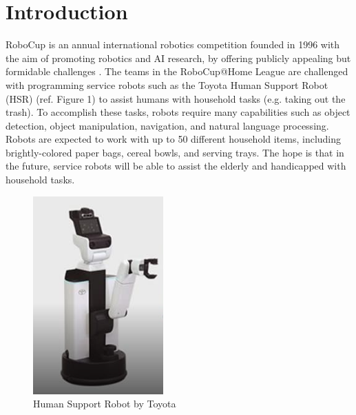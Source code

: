 \documentclass{article}
\begin{document}
\section{Introduction}\label{intro}
RoboCup is an annual international robotics competition founded in 1996 with
the aim of promoting robotics and AI research, by offering publicly 
appealing but formidable challenges \cite{RobocupInitiative1996}.
The teams in the RoboCup@Home League are challenged with programming
service robots such as the Toyota Human Support Robot (HSR) \cite{HSR2018} 
(ref. Figure 1) to assist humans with household tasks (e.g. taking out the 
trash). To accomplish these tasks, robots require many capabilities such as 
object detection, object manipulation, navigation, and natural language 
processing. Robots are expected to work with up to 50 different household 
items, including brightly-colored paper bags, cereal bowls, and serving 
trays. The hope is that in the future, service robots will be able to assist 
the elderly and handicapped with household tasks.
\begin{figure}[h]
  \centering
  \begin{minipage}[c]{0.4\textwidth}
    \includegraphics[width=\textwidth]{HSR.png}
    \caption{Human Support Robot by Toyota}
  \end{minipage}
\end{figure}
\end{document}
